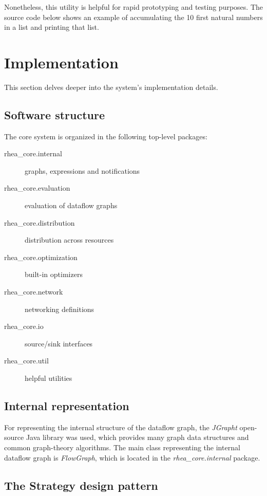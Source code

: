 \documentclass[sigplan,review,anonymous]{acmart}\settopmatter{printfolios=true,printacmref=false}
\begin{document}
Nonetheless, this utility is helpful for rapid prototyping and testing purposes. The source code below shows an example of accumulating the 10 first natural numbers in a list and printing that list.


\section{Implementation} \label{sec:implementation}
This section delves deeper into the system's implementation details.

\subsection{Software structure}

The core system is organized in the following top-level packages:

\begin{description}
  \item[rhea\_core.internal] graphs, expressions and notifications
	\item[rhea\_core.evaluation] evaluation of dataflow graphs
	\item[rhea\_core.distribution] distribution across resources
	\item[rhea\_core.optimization] built-in optimizers
	\item[rhea\_core.network]	networking definitions
	\item[rhea\_core.io] source/sink interfaces
	\item[rhea\_core.util] helpful utilities
\end{description}

\subsection{Internal representation}

For representing the internal structure of the dataflow graph, the \textit{JGrapht} open-source Java library was used, which provides many graph data structures and common graph-theory algorithms. The main class representing the internal dataflow graph is \textit{FlowGraph},  which is located in the \textit{rhea\_core.internal} package.

\subsection{The Strategy design pattern}
\end{document}
